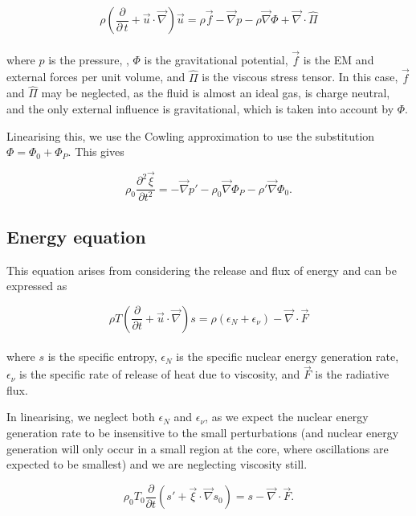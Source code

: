\documentclass[11pt]{amsart}
\begin{document}
\begin{equation} \rho \left( \frac{\partial}{\partial \, t} +  \vec{u} \cdot \vec{\nabla} \right)
\vec{u} = \rho \vec{f} - \vec{\nabla} p - \rho \vec{\nabla} \Phi + \vec{\nabla} \cdot \hat{\Pi}
\end{equation}
\\
where $p$ is the pressure, , $\Phi$ is the gravitational potential, $\vec{f}$ is
the EM and external forces per unit volume, and $\hat{\Pi}$ is the viscous stress tensor. In this
case, $\vec{f}$ and $\hat{\Pi}$ may be neglected, as the fluid is almost an ideal gas, is charge
neutral, and the only external influence is gravitational, which is taken into account by $\Phi$.

Linearising this, we use the Cowling approximation to use the substitution $\Phi = \Phi_{0} + \Phi_{P}$.
This gives

\begin{equation}
\rho_{0} \frac{\partial^{2} \vec{\xi}}{\partial t^{2}} = - \vec{\nabla} p' - \rho_{0} \vec{\nabla} \Phi_{P}
- \rho' \vec{\nabla} \Phi_{0}.
\end{equation}



\subsection{Energy equation}

This equation arises from considering the release and flux of energy and can be expressed as

\begin{equation}
\rho T \left( \frac{\partial}{\partial t} + \vec{u} \cdot \vec{\nabla} \right) s =
\rho \left( \epsilon_{N} + \epsilon_{\nu} \right) - \vec{\nabla} \cdot \vec{F}
\end{equation}
\\
where $s$ is the specific entropy, $\epsilon_{N}$ is the specific nuclear energy generation rate,
$\epsilon_{\nu}$ is the specific rate of release of heat due to viscosity, and $\vec{F}$ is the radiative flux.

In linearising, we neglect both $\epsilon_{N}$ and $\epsilon_{\nu}$, as we expect the nuclear energy
generation rate to be insensitive to the small perturbations (and nuclear energy generation will only
occur in a small region at the core, where oscillations are expected to be smallest) and we are
neglecting viscosity still.

\begin{equation}
\rho_{0} T_{0} \frac{\partial}{\partial t} \left( s' + \vec{\xi} \cdot \vec{\nabla} s_{0} \right)
= s - \vec{\nabla} \cdot \vec{F}.
\end{equation}
\\
\end{document}
